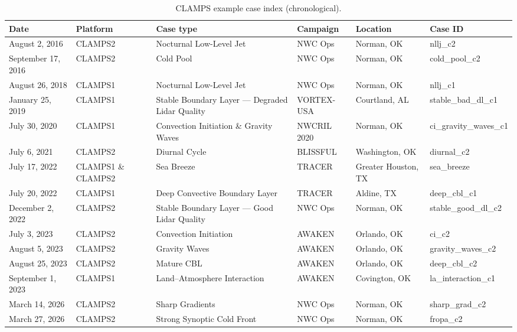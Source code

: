 \documentclass[11pt]{article}
\begin{document}
\begin{table}[htbp]
  \centering
  \caption{CLAMPS example case index (chronological).}
  \label{tab:case-index}
  \small
  \begin{tabular}{@{}lllllp{2.6cm}@{}}
    \toprule
    Date & Platform & Case type & Campaign & Location & Case ID \\
    \midrule
    August 2, 2016 & CLAMPS2 & Nocturnal Low-Level Jet & NWC Ops & Norman, OK & nllj\_c2 \\
    September 17, 2016 & CLAMPS2 & Cold Pool & NWC Ops & Norman, OK & cold\_pool\_c2 \\
    August 26, 2018 & CLAMPS1 & Nocturnal Low-Level Jet & NWC Ops & Norman, OK & nllj\_c1 \\
    January 25, 2019 & CLAMPS1 & Stable Boundary Layer — Degraded Lidar Quality & VORTEX-USA & Courtland, AL & stable\_bad\_dl\_c1 \\
    July 30, 2020 & CLAMPS1 & Convection Initiation \& Gravity Waves & NWCRIL 2020 & Norman, OK & ci\_gravity\_waves\_c1 \\
    July 6, 2021 & CLAMPS2 & Diurnal Cycle & BLISSFUL & Washington, OK & diurnal\_c2 \\
    July 17, 2022 & CLAMPS1 \& CLAMPS2 & Sea Breeze & TRACER & Greater Houston, TX & sea\_breeze \\
    July 20, 2022 & CLAMPS1 & Deep Convective Boundary Layer & TRACER & Aldine, TX & deep\_cbl\_c1 \\
    December 2, 2022 & CLAMPS2 & Stable Boundary Layer — Good Lidar Quality & NWC Ops & Norman, OK & stable\_good\_dl\_c2 \\
    July 3, 2023 & CLAMPS2 & Convection Initiation & AWAKEN & Orlando, OK & ci\_c2 \\
    August 5, 2023 & CLAMPS2 & Gravity Waves & AWAKEN & Orlando, OK & gravity\_waves\_c2 \\
    August 25, 2023 & CLAMPS2 & Mature CBL & AWAKEN & Orlando, OK & deep\_cbl\_c2 \\
    September 1, 2023 & CLAMPS1 & Land–Atmosphere Interaction & AWAKEN & Covington, OK & la\_interaction\_c1 \\
    March 14, 2026 & CLAMPS2 & Sharp Gradients & NWC Ops & Norman, OK & sharp\_grad\_c2 \\
    March 27, 2026 & CLAMPS2 & Strong Synoptic Cold Front & NWC Ops & Norman, OK & fropa\_c2 \\
    \bottomrule
  \end{tabular}
\end{table}
\end{document}
